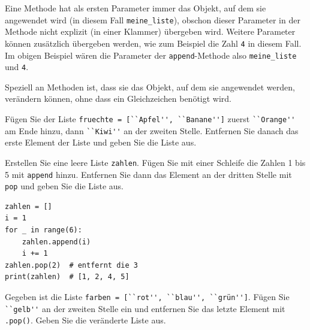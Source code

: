 \begin{mydefinition}
\begin{minipage}{\textwidth}
	\end{minipage}
	Eine Methode hat als ersten Parameter immer das Objekt, auf dem sie angewendet wird (in diesem Fall \lstinline|meine_liste|), obschon dieser Parameter in der Methode nicht explizit (in einer Klammer) übergeben wird. Weitere Parameter können zusätzlich übergeben werden, wie zum Beispiel die Zahl \lstinline|4| in diesem Fall. Im obigen Beispiel wären die Parameter der \lstinline|append|-Methode also \lstinline|meine_liste| und \lstinline|4|.

	Speziell an Methoden ist, dass sie das Objekt, auf dem sie angewendet werden, verändern können, ohne dass ein Gleichzeichen benötigt wird.
\end{mydefinition}


\begin{myexercise}
	Fügen Sie der Liste \lstinline|fruechte = [``Apfel'', ``Banane'']| zuerst \lstinline|``Orange''| am Ende hinzu, dann \lstinline|``Kiwi''| an der zweiten Stelle. Entfernen Sie danach das erste Element der Liste und geben Sie die Liste aus.

	\begin{myanswer}
		
	\end{myanswer}
\end{myexercise}

\begin{myexercise}
	Erstellen Sie eine leere Liste \lstinline|zahlen|. Fügen Sie mit einer Schleife die Zahlen 1 bis 5 mit \lstinline|append| hinzu. Entfernen Sie dann das Element an der dritten Stelle mit \lstinline|pop| und geben Sie die Liste aus.

	\begin{myanswer}
		\begin{lstlisting}
zahlen = []
i = 1
for _ in range(6):
    zahlen.append(i)
    i += 1
zahlen.pop(2)  # entfernt die 3
print(zahlen)  # [1, 2, 4, 5]
\end{lstlisting}
	\end{myanswer}
\end{myexercise}

\begin{myexercise}
	Gegeben ist die Liste \lstinline|farben = [``rot'', ``blau'', ``grün'']|. Fügen Sie \lstinline|``gelb''| an der zweiten Stelle ein und entfernen Sie das letzte Element mit \lstinline|.pop()|. Geben Sie die veränderte Liste aus.

	\begin{myanswer}
		
	\end{myanswer}
\end{myexercise}

